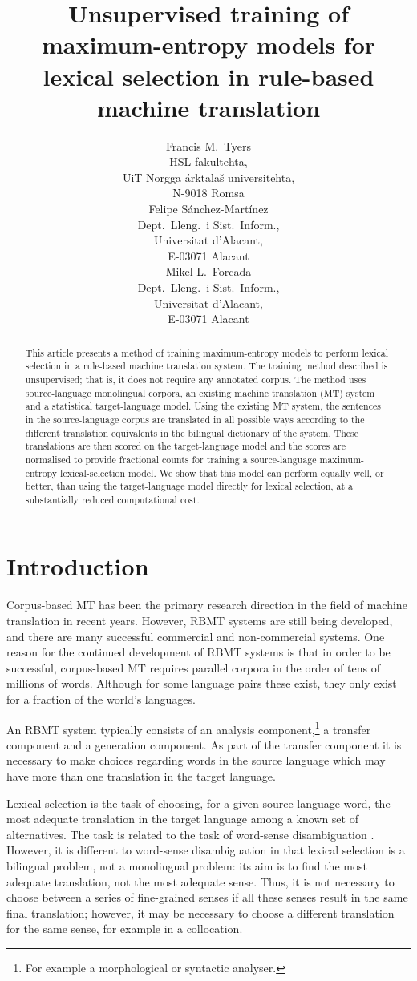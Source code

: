\documentclass[11pt]{article}
\title{Unsupervised training of maximum-entropy models for lexical
    selection in rule-based machine translation}
\author{
 Francis M.\ Tyers \\
 HSL-fakultehta, \\
 UiT Norgga \'{a}rktala\v{s} universitehta, \\
 N-9018 Romsa \\
 \And
 Felipe S\'anchez-Mart\'inez \\
 Dept.\ Lleng.\ i Sist.\ Inform., \\
 Universitat d'Alacant,\\
 E-03071 Alacant\\
 \And
 Mikel L.\ Forcada \\
 Dept.\ Lleng.\ i Sist.\ Inform., \\
 Universitat d'Alacant,\\
 E-03071 Alacant\\
}
\date{}
\begin{document}
\maketitle

\begin{abstract}
  This article presents a method of training maximum-entropy models to
  perform lexical selection in a rule-based machine translation
  system. The training method described is unsupervised; that is, it
  does not require any annotated corpus. The method uses
  source-language monolingual corpora, an existing machine translation
  (MT) system and a statistical target-language model. Using the
  existing MT system, the sentences in the source-language corpus are
  translated in all possible ways according to the different
  translation equivalents in the bilingual dictionary of the system.
  These translations are then scored on the target-language model and
  the scores are normalised to provide fractional counts for training
  a source-language maximum-entropy lexical-selection model. We show
  that this model can perform equally well, or better, than using the
  target-language model directly for lexical selection, at a
  substantially reduced computational cost.
\end{abstract}


\section{Introduction}

Corpus-based MT has been the primary research direction in the field 
of machine translation in recent years. However, RBMT systems are 
still being developed, and there are many successful commercial 
and non-commercial systems. One reason for the continued development
of RBMT systems is that in order to be successful, corpus-based MT requires parallel corpora in
the order of tens of millions of words. Although for some language
pairs these exist, they only exist for a fraction of the 
world's languages. 

An RBMT system typically consists of an analysis component,\footnote{For example
a morphological or syntactic analyser.} a transfer
component and a generation component. As part of the transfer component
it is necessary to make choices regarding words in the source language
which may have more than one translation in the target language.

Lexical selection is the task of choosing, for a given source-language
word, the most adequate translation in the target language among a
known set of alternatives.  The task is related to the task of
word-sense disambiguation \citep{ide98a}. However, it is different to
word-sense disambiguation in that lexical selection is a bilingual
problem, not a monolingual problem: its aim is to find the most
adequate translation, not the most adequate sense. Thus, it is not
necessary to choose between a series of fine-grained senses if all
these senses result in the same final translation; however, it may be
necessary to choose a different translation for the same sense, for
example in a collocation.
\end{document}
